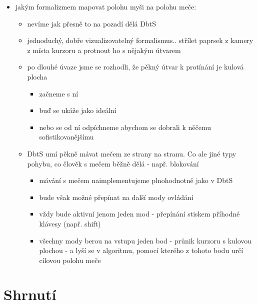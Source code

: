 \begin{itemize}
\begin{itemize}
        \end{itemize}
    \item jakým formalizmem mapovat polohu myši na polohu meče:
        \begin{itemize}
            \item nevíme jak přesně to na pozadí dělá DbtS
            \item jednoduchý, dobře vizualizovatelný formalismus.. střílet paprsek z kamery z místa kurzoru a protnout ho s nějakým útvarem 
            \item po dlouhé úvaze jsme se rozhodli, že pěkný útvar k protínání je kulová plocha
                \begin{itemize}
                    \item začneme s ní
                    \item buď se ukáže jako ideální
                    \item nebo se od ní odpíchneme abychom se dobrali k něčemu sofistikovanějšímu
                \end{itemize}
            \item DbtS umí pěkně mávat mečem ze strany na stranu. Co ale jiné typy pohybu, co člověk s mečem běžně dělá - např. blokování
                \begin{itemize}
                    \item mávání s mečem naimplementujeme plnohodnotně jako v DbtS 
                    \item bude však možné přepínat na další mody ovládání
                    \item vždy bude aktivní jenom jeden mod - přepínání stiskem příhodné klávesy (např. shift)
                    \item všechny mody berou na vstupu jeden bod - průnik kurzoru s kulovou plochou - a lyší se v algoritmu, pomocí kterého z tohoto bodu určí cílovou polohu meče
                \end{itemize}
        \end{itemize}
\end{itemize}

\section{Shrnutí}
